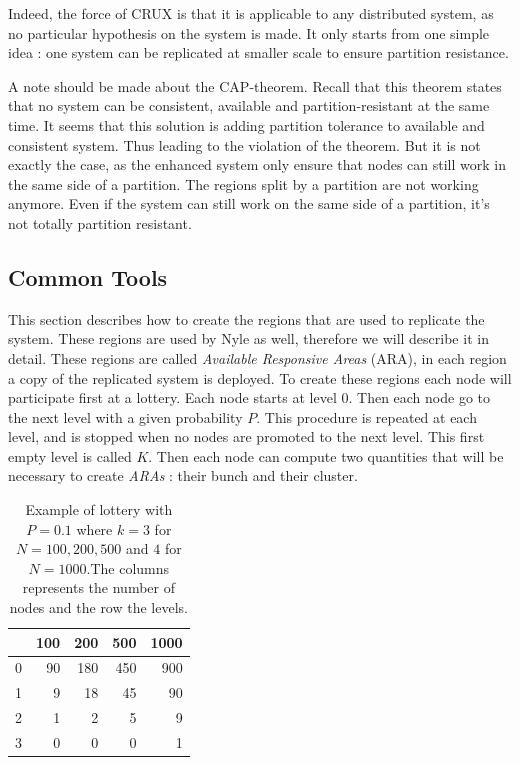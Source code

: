 \documentclass[a4paper,11pt,oneside]{report}
\begin{document}
Indeed, the force of CRUX \cite{Basescu2014} is that it is applicable to any
distributed system, as no particular hypothesis on the system is made. It only
starts from one simple idea : one system can be replicated at smaller scale to
ensure partition resistance. 

A note should be made about the CAP-theorem. Recall that this theorem states
that no system can be consistent, available and partition-resistant at the same
time. It seems that this solution is adding partition tolerance to available
and consistent system. Thus leading to the violation of the theorem. But it is
not exactly the case, as the enhanced system only ensure that nodes can still
work in the same side of a partition. The regions split by a partition are not
working anymore. Even if the system can still work on the same side of a
partition, it's not totally partition resistant.

\subsection{Common Tools} \label{sec:common-tools}
This section describes how to create the
regions that are used to replicate the system. These regions are used by Nyle
as well, therefore we will describe it in detail. These regions are called
\textit{Available Responsive Areas} (ARA), in each region a copy of the replicated
system is deployed. To create these regions each node will participate first at
a lottery. Each node starts at level 0. Then each node go to the next level
with a given probability $P$. This
procedure is repeated at each level, and is stopped when no nodes are promoted
to the next level. This first empty level is called $K$. Then each node can
compute two quantities that will be necessary to create \textit{ARAs} : their
bunch and their cluster. 

\begin{table}[] 
\centering
\begin{tabular}{rrrrr}
& 100 & 200 & 500 & 1000 \\ \hline
\multicolumn{1}{r|}{0} & 90  & 180 & 450 & 900  \\
\multicolumn{1}{r|}{1} & 9 & 18  & 45  & 90   \\
\multicolumn{1}{r|}{2} & 1   & 2   & 5   & 9 \\
\multicolumn{1}{r|}{3} & 0   & 0   & 0   & 1
\end{tabular}
\caption{Example of lottery with $P = 0.1$ where $k= 3$ for $N= 100,200,500$
and $4$ for $N = 1000$.The columns represents the number of nodes and the row the levels. }
\label{example-lottery}
 \end{table}
\end{document}
